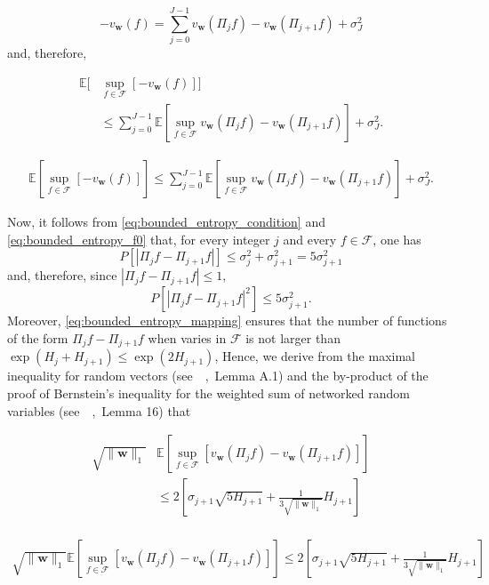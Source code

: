\documentclass[letterpaper]{article} %
\def\DoubleColumn{}
\def\DoubleColumnEnd{}
\def\SingleColumn{}
\def\SingleColumnEnd{}
\newcommand{\E}{\mathbb{E}}
\newcommand{\weight}{\mathbf{w}}
\newcommand{\normo}[1]{\|#1\|_1}
\newcommand{\citep}[3]{(#1\ \citeauthor{#3}\ \citeyear{#3},\ #2)}
\begin{document}
    \[-v_\weight(f)=\sum_{j=0}^{J-1}v_\weight(\Pi_jf)-v_\weight(\Pi_{j+1}f)+\sigma_J^2\]
    and, therefore,
    \DoubleColumn
    \begin{equation}
        \begin{aligned}
            \label{eq:bounded_entropy_decomposition}
            \E[&\sup_{f\in\mathcal{F}}[-v_\weight(f)]]\\
            &\le \sum_{j=0}^{J-1}\E[\sup_{f\in\mathcal{F}}v_\weight(\Pi_jf)-v_\weight(\Pi_{j+1}f)]+\sigma_J^2.
        \end{aligned}
    \end{equation}
    \DoubleColumnEnd
    \SingleColumn
    \begin{equation}
        \begin{aligned}
            \label{eq:bounded_entropy_decomposition}
            \E[\sup_{f\in\mathcal{F}}[-v_\weight(f)]]\le \sum_{j=0}^{J-1}\E[\sup_{f\in\mathcal{F}}v_\weight(\Pi_jf)-v_\weight(\Pi_{j+1}f)]+\sigma_J^2.
        \end{aligned}
    \end{equation}
    \SingleColumnEnd
    Now, it follows from \eqref{eq:bounded_entropy_condition} and \eqref{eq:bounded_entropy_f0} that, for every integer $j$ and every $f\in\mathcal{F}$, one has
    \[P[|\Pi_jf-\Pi_{j+1}f|]\le \sigma_j^2+\sigma_{j+1}^2=5\sigma_{j+1}^2\]
    and, therefore, since $|\Pi_jf-\Pi_{j+1}f|\le 1$,
    \[P[|\Pi_jf-\Pi_{j+1}f|^2]\le 5\sigma_{j+1}^2.\]
    Moreover, \eqref{eq:bounded_entropy_mapping} ensures that the number of functions of the form $\Pi_jf-\Pi_{j+1}f$ when varies in $\mathcal{F}$ is not larger than $\exp(H_j+H_{j+1})\le \exp(2H_{j+1})$, Hence, we derive from the maximal inequality for random vectors \citep{see}{Lemma A.1}{Massart2006} and the by-product of the proof of Bernstein's inequality for the weighted sum of networked random variables \citep{see}{Lemma 16}{wang2017learning} that
    \DoubleColumn
    \begin{align*}
        \sqrt{\normo{\weight{}}}&\E[\sup_{f\in\mathcal{F}}[v_\weight(\Pi_jf)-v_\weight(\Pi_{j+1}f)]]\\
        &\le 2[\sigma_{j+1}\sqrt{5H_{j+1}}+\frac{1}{3\sqrt{\normo{\weight{}}}}H_{j+1}]\\
    \end{align*}
    \DoubleColumnEnd
    \SingleColumn
    \begin{align*}
        \sqrt{\normo{\weight{}}}\E[\sup_{f\in\mathcal{F}}[v_\weight(\Pi_jf)-v_\weight(\Pi_{j+1}f)]]\le 2[\sigma_{j+1}\sqrt{5H_{j+1}}+\frac{1}{3\sqrt{\normo{\weight{}}}}H_{j+1}]\\
    \end{align*}
\end{document}
